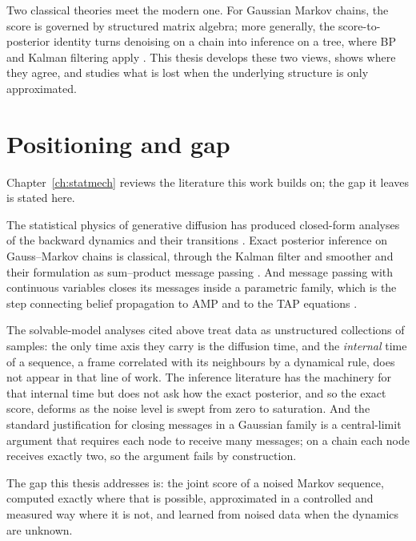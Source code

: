 Two classical theories meet the modern one. For Gaussian Markov chains, the score is governed by structured matrix algebra; more generally, the score-to-posterior identity turns denoising on a chain into inference on a tree, where BP and Kalman filtering apply \citep{pearl1988probabilistic,mezard2009information,kalman1960new,donoho2009message}. This thesis develops these two views, shows where they agree, and studies what is lost when the underlying structure is only approximated.


\section{Positioning and gap}

Chapter~\ref{ch:statmech} reviews the literature this work builds on; the gap
it leaves is stated here.

The statistical physics of generative diffusion has
produced closed-form analyses of the backward dynamics and their transitions
\citep{biroli2023generative, biroli2024dynamical, achilli2026speciation,
sclocchi2025phase, bonnaire2025memorize}. Exact posterior inference on
Gauss--Markov chains is classical, through the Kalman filter and smoother and
their formulation as sum--product message passing
\citep{kalman1960new, rauch1965maximum, kschischang2001factor,
mezard2009information}. And message passing with continuous variables closes
its messages inside a parametric family, which is the step connecting belief
propagation to AMP and to the TAP equations
\citep{thouless1977solution, donoho2009message, zdeborova2016statistical}.

The solvable-model analyses cited above treat data as
unstructured collections of samples: the only time axis they carry is the
diffusion time, and the \emph{internal} time of a sequence, a frame correlated
with its neighbours by a dynamical rule, does not appear in that line of
work. The inference
literature has the machinery for that internal time but does not ask how the exact posterior, and
so the exact score, deforms as the noise level is swept from zero to
saturation. And the standard justification for closing messages in a Gaussian
family is a central-limit argument that requires each node to receive many
messages; on a chain each node receives exactly two, so the argument fails by
construction.

The gap this thesis addresses is: the joint score of a noised
Markov sequence, computed exactly where that is possible, approximated in a
controlled and measured way where it is not, and learned from noised data when
the dynamics are unknown.

